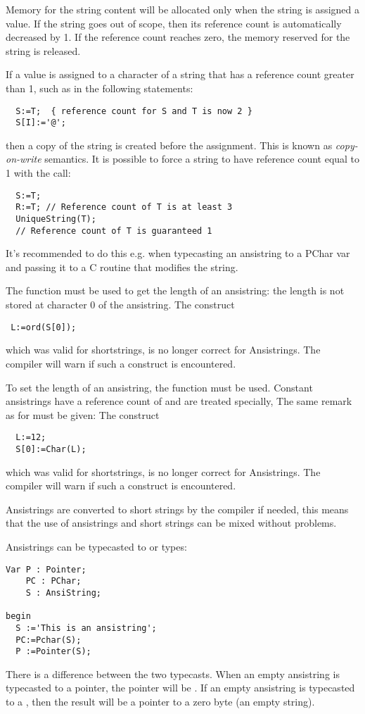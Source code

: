 Memory for the string content will be allocated only when the string is 
assigned a value. If the string goes out of scope, then its reference 
count is automatically  decreased by 1. If the reference count reaches 
zero, the memory reserved for the string is released.

If a value is assigned to a character of a string that has a reference count
greater than 1, such as in the following
statements:
\begin{verbatim}
  S:=T;  { reference count for S and T is now 2 }
  S[I]:='@';
\end{verbatim}
then a copy of the string is created before the assignment. This is known
as {\em copy-on-write} semantics. It is possible to force a string to have
reference count equal to 1 with the  call:
\begin{verbatim}
  S:=T;
  R:=T; // Reference count of T is at least 3
  UniqueString(T); 
  // Reference count of T is guaranteed 1
\end{verbatim}
It's recommended to do this e.g. when typecasting an ansistring to a PChar var
and passing it to a C routine that modifies the string.

The  function must be used to get the length of an
ansistring: the length is not stored at character 0 of the ansistring. 
The construct
\begin{verbatim}
 L:=ord(S[0]);
\end{verbatim}
which was valid for \tp shortstrings, is no longer correct for
Ansistrings. The compiler will warn if such a construct is encountered.


To set the length of an ansistring, the  function must be used.
Constant ansistrings have a reference count of  and are treated specially,
The same remark as for  must be given: The construct
\begin{verbatim}
  L:=12;
  S[0]:=Char(L);
\end{verbatim}
which was valid for \tp shortstrings, is no longer correct for
Ansistrings. The compiler will warn if such a construct is encountered.

Ansistrings are converted to short strings by the compiler if needed,
this means that the use of ansistrings and short strings can be mixed
without problems.

Ansistrings can be typecasted to  or  types:
\begin{verbatim}
Var P : Pointer;
    PC : PChar;
    S : AnsiString;

begin
  S :='This is an ansistring';
  PC:=Pchar(S);
  P :=Pointer(S);
\end{verbatim}
There is a difference between the two typecasts. When an empty
ansistring is typecasted to a pointer, the pointer will be . If an
empty ansistring is typecasted to a , then the result will be a pointer to a
zero byte (an empty string).

